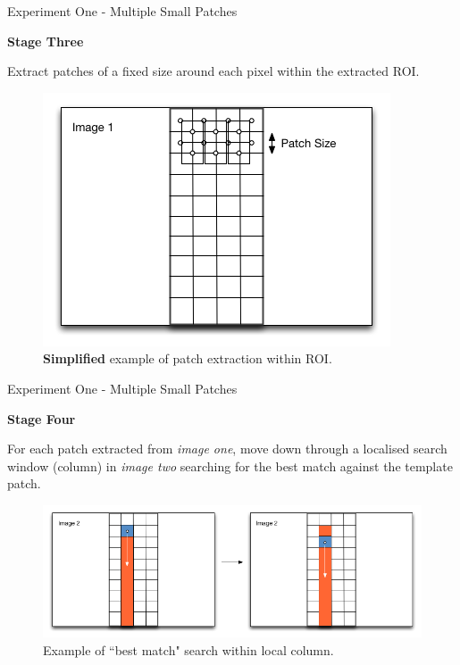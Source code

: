 \documentclass[10pt, compress]{beamer}
\begin{document}
\begin{frame}{Experiment One - Multiple Small Patches}

\textbf{Stage Three} \\ \vspace{0.2cm}

Extract patches of a fixed size around each pixel within the extracted ROI.

\begin{figure}[ht!]
\centering
\includegraphics[scale=0.4]{stage2.png}
\caption{\textbf{Simplified} example of patch extraction within ROI.}
  \end{figure}
  
\end{frame}

\begin{frame}{Experiment One - Multiple Small Patches}

\textbf{Stage Four} \\ \vspace{0.2cm}

For each patch extracted from \emph{image one}, move down through a localised search window (column) in \emph{image two} searching for the best match against the template patch. 

\begin{figure}[ht!]
\centering
\includegraphics[scale=0.35]{stage3.png}
\caption{Example of ``best match" search within local column.}
\end{figure}
  
\end{frame}
\end{document}
